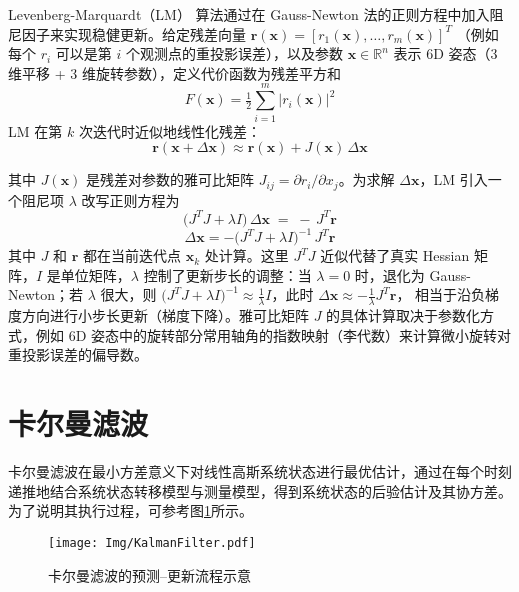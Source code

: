 Levenberg-Marquardt（LM） 算法通过在 Gauss-Newton 法的正则方程中加入阻尼因子来实现稳健更新。给定残差向量 
\(\mathbf{r}(\mathbf{x}) = [r_1(\mathbf{x}), \dots, r_m(\mathbf{x})]^T\) 
（例如每个 \(r_i\) 可以是第 \(i\) 个观测点的重投影误差），以及参数 \(\mathbf{x}\in \mathbb{R}^n\) 表示 6D 姿态（3 维平移 + 3 维旋转参数），定义代价函数为残差平方和 
\begin{equation}
	F(\mathbf{x}) = \tfrac{1}{2}\sum_{i=1}^m \bigl\lvert r_i(\mathbf{x})\bigr\rvert^2
\end{equation}
LM 在第 \(k\) 次迭代时近似地线性化残差：
\begin{equation}
	\mathbf{r}(\mathbf{x}+\Delta \mathbf{x}) \approx \mathbf{r}(\mathbf{x}) + J(\mathbf{x}) \,\Delta \mathbf{x}
\end{equation}

其中 \(J(\mathbf{x})\) 是残差对参数的雅可比矩阵 \(J_{ij} = \partial r_i/\partial x_j\)。为求解 \(\Delta \mathbf{x}\)，LM 引入一个阻尼项 \(\lambda\) 改写正则方程为
\begin{equation}
	\bigl(J^T J + \lambda I\bigr)\,\Delta \mathbf{x} \;=\; -\,J^T \mathbf{r}
\end{equation}
\begin{equation}
	\Delta \mathbf{x} 
	= -\bigl(J^{T} J + \lambda I \bigr)^{-1} \, J^{T} \mathbf{r}
\end{equation}
其中 \(J\) 和 \(\mathbf{r}\) 都在当前迭代点 \(\mathbf{x}_k\) 处计算。这里 \(J^T J\) 近似代替了真实 Hessian 矩阵，\(I\) 是单位矩阵，\(\lambda\) 控制了更新步长的调整：当 \(\lambda=0\) 时，退化为 Gauss-Newton；若 \(\lambda\) 很大，则 \(\bigl(J^T J + \lambda I\bigr)^{-1} \approx \tfrac{1}{\lambda}I\)，此时 
\(\Delta \mathbf{x} \approx -\tfrac{1}{\lambda} J^T \mathbf{r}\)，
相当于沿负梯度方向进行小步长更新（梯度下降）。雅可比矩阵 \(J\) 的具体计算取决于参数化方式，例如 6D 姿态中的旋转部分常用轴角的指数映射（李代数）来计算微小旋转对重投影误差的偏导数。

\section{卡尔曼滤波}
卡尔曼滤波在最小方差意义下对线性高斯系统状态进行最优估计\cite{kalman1960new}，通过在每个时刻递推地结合系统状态转移模型与测量模型，得到系统状态的后验估计及其协方差。为了说明其执行过程，可参考图\ref{fig:KalmanFilter}所示。

\begin{figure}[htbp]
	\centering
	\texttt{[image: Img/KalmanFilter.pdf]}
	\caption{卡尔曼滤波的预测–更新流程示意}
	\label{fig:KalmanFilter}
	\vspace{-3ex}
\end{figure}


